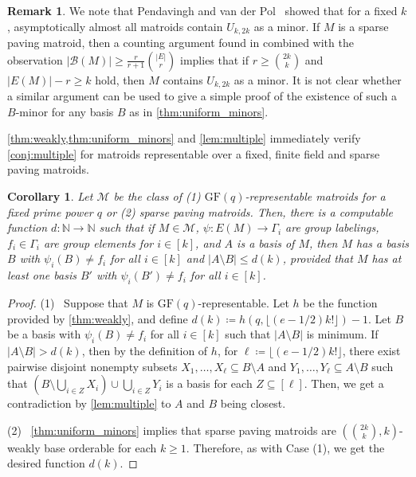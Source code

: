 \documentclass{article}
\newtheorem{corollary}[theorem]{Corollary}
\theoremstyle{definition}
\newtheorem{remark}[theorem]{Remark}
\newcommand{\GF}{\mathrm{GF}}
\newcommand{\N}{\mathbb{N}}
\begin{document}
\begin{remark}
We note that Pendavingh and van der Pol~\cite{pendavingh2018number} showed that for a fixed $k$, asymptotically almost all matroids contain $U_{k,2k}$ as a minor. If $M$ is a sparse paving matroid, then a counting argument found in \cite[Lemma~4.7]{pendavingh2018number} combined with the observation $|\mathcal{B}(M)| \ge \frac{r}{r+1} \binom{|E|}{r}$ implies that if $r \ge \binom{2k}{k}$ and $|E(M)|-r \ge k$ hold, then $M$ contains $U_{k,2k}$ as a minor. It is not clear whether a similar argument can be used to give a simple proof of the existence of such a $B$-minor for any basis $B$ as in \cref{thm:uniform_minors}.
\end{remark}

\cref{thm:weakly,thm:uniform_minors} and \cref{lem:multiple} immediately verify \cref{conj:multiple} for matroids representable over a fixed, finite field and sparse paving matroids.

\begin{corollary}
\label{cor:gfq-multiple}
    Let $\mathcal{M}$ be the class of (1) $\GF(q)$-representable matroids for a fixed prime power $q$ or (2) sparse paving matroids.
    Then, there is a computable function $d \colon \N \to \N$ such that if $M \in \mathcal{M}$, $\psi\colon E(M)\to \Gamma_i$ are group labelings, $f_i \in \Gamma_i$ are group elements for $i \in [k]$, and $A$ is a basis of $M$, then $M$ has a basis $B$ with $\psi_i(B) \ne f_i$ for all $i \in [k]$ and $|A\setminus B| \le d(k)$, provided that $M$ has at least one basis $B'$ with $\psi_i(B') \ne f_i$ for all $i \in [k]$.
\end{corollary}

\begin{proof}
(1)~
Suppose that $M$ is $\GF(q)$-representable.
Let $h$ be the function provided by \cref{thm:weakly}, and define $d(k)\coloneqq h(q, \lfloor (e-1/2) k!\rfloor)-1$. Let $B$ be a basis with $\psi_i(B) \ne f_i$ for all $i \in [k]$ such that $|A\setminus B|$ is minimum. If $|A\setminus B|>d(k)$, then by the definition of $h$, for $\ell \coloneqq \lfloor (e-1/2) k!\rfloor$, there exist pairwise disjoint nonempty subsets $X_1,\dots, X_\ell \subseteq B \setminus A$ and $Y_1, \dots, Y_\ell \subseteq A \setminus B$ such that $\left(B \setminus \bigcup_{i\in Z} X_i\right) \cup \bigcup_{i \in Z} Y_i$ is a basis for each $Z \subseteq [\ell]$. Then, we get a contradiction by \cref{lem:multiple} to $A$ and $B$ being closest.

(2)~
\cref{thm:uniform_minors} implies that sparse paving matroids are $(\binom{2k}{k}, k)$-weakly base orderable for each $k \ge 1$.
Therefore, as with Case (1), we get the desired function $d(k)$.
\end{proof}
\end{document}
